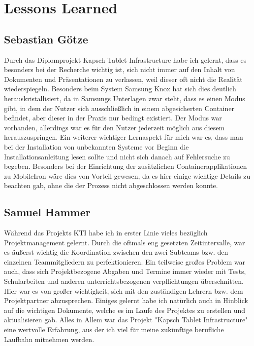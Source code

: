 \chapter{Lessons Learned}
\section{Sebastian Götze}
Durch das Diplomprojekt Kapsch Tablet Infrastructure habe ich gelernt, dass es besonders bei der Recherche wichtig ist, sich nicht immer auf den Inhalt von Dokumenten und Präsentationen zu verlassen, weil dieser oft nicht die Realität wiederspiegeln. Besonders beim System Samsung Knox hat sich dies deutlich herauskristallisiert, da in Samsungs Unterlagen zwar steht, dass es einen Modus gibt, in dem der Nutzer sich ausschließlich in einem abgesicherten Container befindet, aber dieser in der Praxis nur bedingt existiert. Der Modus war vorhanden, allerdings war es für den Nutzer jederzeit möglich aus diesem herauszuspringen. Ein weiterer wichtiger Lernaspekt für mich war es, dass man bei der Installation von unbekannten Systeme vor Beginn die Installationsanleitung lesen sollte und nicht sich danach auf Fehlersuche zu begeben. Besonders bei der Einrichtung der zusätzlichen Containerapplikationen zu MobileIron wäre dies von Vorteil gewesen, da es hier einige wichtige Details zu beachten gab, ohne die der Prozess nicht abgeschlossen werden konnte.
\section{Samuel Hammer}
Während das Projekts KTI habe ich in erster Linie vieles bezüglich Projektmanagement gelernt. Durch die oftmals eng gesetzten Zeitintervalle, war es äußerst wichtig die Koordination zwischen den zwei Subteams bzw. den einzelnen Teammitgliedern zu perfektionieren. 
Ein teilweise großes Problem war auch, dass sich Projektbezogene Abgaben und Termine immer wieder mit Tests, Schularbeiten und anderen unterrichtsbezogenen verpflichtungen überschnitten. Hier war es von großer wichtigkeit, sich mit den zuständigen Lehrern bzw. dem Projektpartner abzusprechen. 
Einiges gelernt habe ich natürlich auch in Hinblick auf die wichtigen Dokumente, welche es im Laufe des Projektes zu erstellen und aktualisieren gab.
Alles in Allem war das Projekt "Kapsch Tablet Infrastructure" eine wertvolle Erfahrung, aus der ich viel für meine zukünftige berufliche Laufbahn mitnehmen werden.

\newpage

